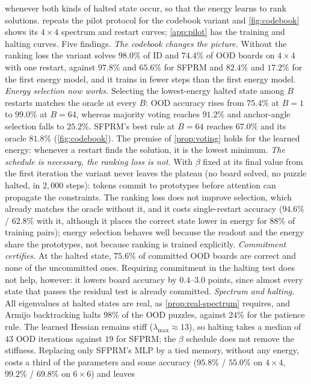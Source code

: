 whenever both kinds of halted state occur, so that the energy learns to rank solutions.
 repeats the pilot protocol for the codebook variant and \cref{fig:codebook}
shows its $4\times4$ spectrum and restart curves; \cref{app:pilot} has the training and halting
curves. Five findings.
\emph{The codebook changes the picture.} Without the ranking loss the variant solves $98.0\%$ of
ID and $74.4\%$ of OOD boards on $4\times4$ with one restart, against $97.8\%$ and $65.6\%$ for SFPRM
and $82.4\%$ and $17.2\%$ for the first energy model, and it trains in fewer steps than the first
energy model.
\emph{Energy selection now works.} Selecting the lowest-energy halted state among $B$ restarts
matches the oracle at every $B$: OOD accuracy rises from $75.4\%$ at $B=1$ to $99.0\%$ at $B=64$,
whereas majority voting reaches $91.2\%$ and anchor-angle selection falls to $25.2\%$. SFPRM's best
rule at $B=64$ reaches $67.0\%$ and its oracle $81.8\%$ (\cref{fig:codebook}). The premise of
\cref{prop:voting} holds for the learned energy: whenever a restart finds the solution, it is the
lowest minimum.
\emph{The schedule is necessary, the ranking loss is not.} With $\beta$ fixed at its final value from
the first iteration the variant never leaves the plateau (no board solved, no puzzle halted, in
$2{,}000$ steps): tokens commit to prototypes before attention can propagate the constraints. The ranking loss does not improve
selection, which already matches the oracle without it, and it costs single-restart accuracy
($94.6\%$ / $62.8\%$ with it, although it places the correct state lower in energy for $88\%$ of
training pairs); energy selection behaves well because the readout and the energy share the
prototypes, not because ranking is trained explicitly.
\emph{Commitment certifies.} At the halted state, $75.6\%$ of committed OOD boards are correct and
none of the uncommitted ones. Requiring commitment in the halting test does not help, however: it
lowers board accuracy by $0.4$--$3.0$ points, since almost every state that passes the residual test
is already committed.
\emph{Spectrum and halting.} All eigenvalues at halted states are real, as \cref{prop:real-spectrum}
requires, and Armijo backtracking halts $98\%$ of the OOD puzzles, against $24\%$ for the patience
rule. The learned Hessian remains stiff ($\lambda_{\max}\approx13$), so halting takes a median of
$43$ OOD iterations against $19$ for SFPRM; the $\beta$ schedule does not remove the stiffness.
Replacing only SFPRM's MLP by a tied memory, without any energy, costs a third of the parameters and
some accuracy ($95.8\%$ / $55.0\%$ on $4\times4$, $99.2\%$ / $69.8\%$ on $6\times6$) and leaves
